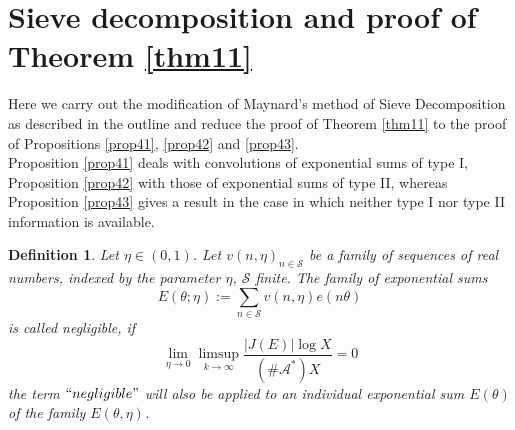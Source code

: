 \documentclass{amsart}
\numberwithin{equation}{subsection}
\newtheorem{definition}[theorem]{Definition}
\begin{document}


\section{Sieve decomposition and proof of Theorem \ref{thm11}}

Here we carry out the modification of Maynard's method of Sieve Decomposition as described in the outline and reduce the proof of Theorem \ref{thm11} to the proof of Propositions \ref{prop41}, \ref{prop42} and \ref{prop43}.\\
Proposition \ref{prop41} deals with convolutions of exponential sums of type I, Proposition \ref{prop42} with those of exponential sums of type II, whereas Proposition \ref{prop43} gives a result in the case in which neither type I nor type II information is available.

\begin{definition}
Let $\eta\in (0,1)$. Let $v(n, \eta)_{n\in\mathcal{S}}$ be a family of sequences of real numbers, indexed by the parameter $\eta$, $\mathcal{S}$ finite. The family of exponential sums 
$$E(\theta; \eta):=\sum_{n\in\mathcal{S}}v(n, \eta)e(n\theta)$$
is called \textit{negligible}, if 
$$\lim_{\eta\rightarrow 0}\limsup_{k\rightarrow \infty} \frac{|J(E)|\log X}{(\#\mathcal{A}^*)X}=0$$
the term $``negligible"$ will also be applied to an individual exponential sum $E(\theta)$ of the family $E(\theta, \eta)$.
\end{definition}
%
%
\end{document}
